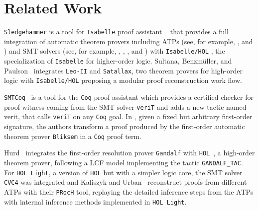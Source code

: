 \documentclass[main.tex]{subfiles}
\begin{document}

\section{Related Work}
\label{sec:related-work}

\verb!Sledgehammer! is a tool for \verb!Isabelle! proof assistant
~\cite{paulson1994isabelle} that provides a full integration of automatic
theorem provers including ATPs
(see, for example, \cite{meng2006automation}, \cite{blanchette2013extending}
and \cite{Fleury2014}) and SMT solvers (see, for example,
\cite{hurlin07practical}, \cite{bohme2010},
\cite{blanchette2013extending}, and \cite{Fleury2014}) with
\verb!Isabelle/HOL! \cite{nipkow2002isabelle}, the specialization of
\verb!Isabelle! for higher-order logic. Sultana, Benzm{\"{u}}ller, and
Paulson~\cite{Een2004} integrates \verb!Leo-II! and \verb!Satallax!, two
theorem provers for high-order logic with \verb!Isabelle/HOL! proposing a
modular proof reconstruction work flow.

\verb!SMTCoq!~\cite{armand2011,Ekici2017} is a tool for the \verb!Coq!
proof assistant \cite{coqteam} which provides a certified checker for
proof witness coming from the SMT solver \verb!veriT! \cite{bouton2009}
and adds a new tactic named verit, that calls \verb!veriT! on any
\verb!Coq! goal. In \cite{bezem2002automated}, given a fixed but arbitrary
first-order signature, the authors transform a proof produced by the
first-order automatic theorem prover \verb!Bliksem! \cite{deNivelle2003}
in a \verb!Coq! proof term.

Hurd~\cite{Hurd1999} integrates the first-order resolution prover
\verb!Gandalf! with \verb!HOL!~\cite{norrish2007hol}, a high-order theorem
prover, following a LCF model implementing the tactic \verb!GANDALF_TAC!.
For \verb!HOL Light!, a version of \verb!HOL! but with a simpler logic core,
the SMT solver \verb!CVC4! was integrated and Kaliszyk and
Urban~\cite{kaliszyk2013} reconstruct proofs from different ATPs with their
\verb!PRocH! tool, replaying the detailed inference steps from the ATPs with
internal inference methods implemented in \verb!HOL Light!.



\end{document}
